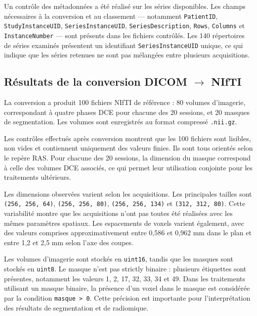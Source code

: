Un contrôle des métadonnées a été réalisé sur les séries disponibles. Les champs nécessaires à la conversion et au classement --- notamment \texttt{PatientID}, \texttt{StudyInstanceUID}, \texttt{SeriesInstanceUID}, \texttt{SeriesDescription}, \texttt{Rows}, \texttt{Columns} et \texttt{InstanceNumber} --- sont présents dans les fichiers contrôlés. Les 140 répertoires de séries examinés présentent un identifiant \texttt{SeriesInstanceUID} unique, ce qui indique que les séries retenues ne sont pas mélangées entre plusieurs acquisitions.

\subsection{\texorpdfstring{Résultats de la conversion DICOM $\rightarrow$ NIfTI}{Résultats de la conversion DICOM vers NIfTI}}
\label{subsec:resultats_conversion}

La conversion a produit 100 fichiers NIfTI de référence : 80 volumes d'imagerie, correspondant à quatre phases DCE pour chacune des 20 sessions, et 20 masques de segmentation. Les volumes sont enregistrés au format compressé \texttt{.nii.gz}.

Les contrôles effectués après conversion montrent que les 100 fichiers sont lisibles, non vides et contiennent uniquement des valeurs finies. Ils sont tous orientés selon le repère RAS. Pour chacune des 20 sessions, la dimension du masque correspond à celle des volumes DCE associés, ce qui permet leur utilisation conjointe pour les traitements ultérieurs.

Les dimensions observées varient selon les acquisitions. Les principales tailles sont \texttt{(256, 256, 64)}, \texttt{(256, 256, 80)}, \texttt{(256, 256, 134)} et \texttt{(312, 312, 80)}. Cette variabilité montre que les acquisitions n'ont pas toutes été réalisées avec les mêmes paramètres spatiaux. Les espacements de voxels varient également, avec des valeurs comprises approximativement entre 0,586 et 0,962 mm dans le plan et entre 1,2 et 2,5 mm selon l'axe des coupes.

Les volumes d'imagerie sont stockés en \texttt{uint16}, tandis que les masques sont stockés en \texttt{uint8}. Le masque n'est pas strictly binaire : plusieurs étiquettes sont présentes, notamment les valeurs 1, 2, 17, 32, 33, 34 et 49. Dans les traitements utilisant un masque binaire, la présence d'un voxel dans le masque est considérée par la condition \texttt{masque > 0}. Cette précision est importante pour l'interprétation des résultats de segmentation et de radiomique.

